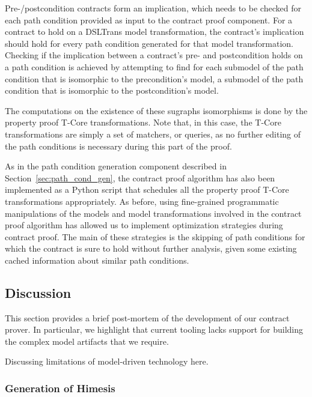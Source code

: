 Pre-/postcondition contracts form an implication, which needs to be checked for
each path condition provided as input to the contract proof component. For a
contract to hold on a DSLTrans model transformation, the contract's implication
should hold for every path condition generated for that model transformation.
Checking if the implication between a contract's pre- and postcondition holds on
a path condition is achieved by attempting to find for each submodel of the path
condition that is isomorphic to the precondition's model, a submodel of the path
condition that is isomorphic to the postcondition's model.

The computations on the existence of these sugraphs isomorphisms is done by the
property proof T-Core transformations. Note
that, in this case, the T-Core transformations are simply a set of matchers, or
queries, as no further editing of the path conditions is necessary during this
part of the proof.

As in the path condition generation component described in
Section~\ref{sec:path_cond_gen}, the contract proof algorithm has also been
implemented as a Python script that schedules all the property proof T-Core
transformations appropriately. As before, using fine-grained programmatic
manipulations of the models and model transformations involved in the contract
proof algorithm has allowed us to implement optimization strategies during
contract proof. The main of these strategies is the skipping of path conditions
for which the contract is sure to hold without further analysis, given some
existing cached information about similar path conditions.

\subsection{Discussion}

This section provides a brief post-mortem of the development of our contract prover. In particular, we highlight that current tooling lacks support for building the complex model artifacts that we require.

Discussing limitations of model-driven technology here.


\subsubsection{Generation of Himesis}

